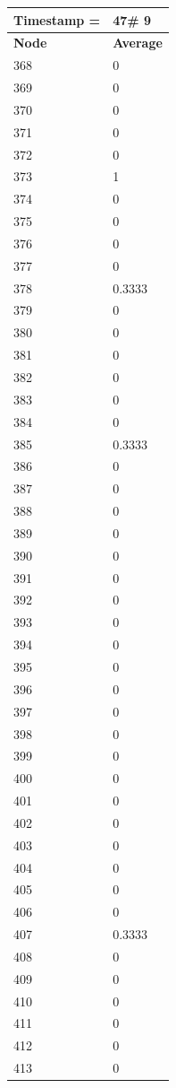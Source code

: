 \begin{tabular}{|l||l|}
\hline
\textbf{Timestamp =} & \textbf{47}\# 9\\\hline
	\textbf{Node} & \textbf{Average} \\ \hline
\hline
	368 & 0 \\ \hline
	369 & 0 \\ \hline
	370 & 0 \\ \hline
	371 & 0 \\ \hline
	372 & 0 \\ \hline
	373 & 1 \\ \hline
	374 & 0 \\ \hline
	375 & 0 \\ \hline
	376 & 0 \\ \hline
	377 & 0 \\ \hline
	378 & 0.3333 \\ \hline
	379 & 0 \\ \hline
	380 & 0 \\ \hline
	381 & 0 \\ \hline
	382 & 0 \\ \hline
	383 & 0 \\ \hline
	384 & 0 \\ \hline
	385 & 0.3333 \\ \hline
	386 & 0 \\ \hline
	387 & 0 \\ \hline
	388 & 0 \\ \hline
	389 & 0 \\ \hline
	390 & 0 \\ \hline
	391 & 0 \\ \hline
	392 & 0 \\ \hline
	393 & 0 \\ \hline
	394 & 0 \\ \hline
	395 & 0 \\ \hline
	396 & 0 \\ \hline
	397 & 0 \\ \hline
	398 & 0 \\ \hline
	399 & 0 \\ \hline
	400 & 0 \\ \hline
	401 & 0 \\ \hline
	402 & 0 \\ \hline
	403 & 0 \\ \hline
	404 & 0 \\ \hline
	405 & 0 \\ \hline
	406 & 0 \\ \hline
	407 & 0.3333 \\ \hline
	408 & 0 \\ \hline
	409 & 0 \\ \hline
	410 & 0 \\ \hline
	411 & 0 \\ \hline
	412 & 0 \\ \hline
	413 & 0 \\ \hline
\end{tabular}

